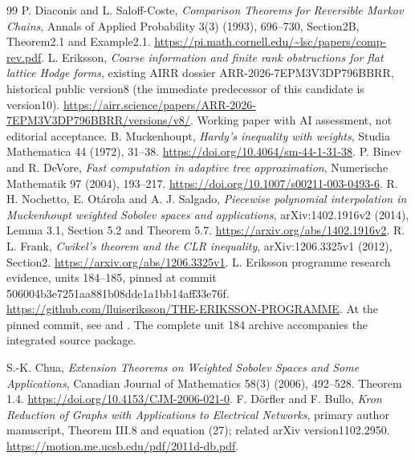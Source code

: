 \documentclass[11pt]{article}
\begin{document}
\begin{thebibliography}{99}
 P. Diaconis and L. Saloff-Coste,
\emph{Comparison Theorems for Reversible Markov Chains},
Annals of Applied Probability 3(3) (1993), 696--730,
Section2B, Theorem2.1 and Example2.1.
\url{https://pi.math.cornell.edu/~lsc/papers/comp-rev.pdf}.
 L. Eriksson, \emph{Coarse information and finite rank
obstructions for flat lattice Hodge forms}, existing AIRR dossier
ARR-2026-7EPM3V3DP796BBRR, historical public version8 (the immediate
predecessor of this candidate is version10).
\url{https://airr.science/papers/ARR-2026-7EPM3V3DP796BBRR/versions/v8/}.
Working paper with AI assessment, not editorial acceptance.
 B. Muckenhoupt, \emph{Hardy's inequality with weights},
Studia Mathematica 44 (1972), 31--38.
\url{https://doi.org/10.4064/sm-44-1-31-38}.
 P. Binev and R. DeVore, \emph{Fast computation in adaptive
tree approximation}, Numerische Mathematik 97 (2004), 193--217.
\url{https://doi.org/10.1007/s00211-003-0493-6}.
 R. H. Nochetto, E. Ot\'arola and A. J. Salgado,
\emph{Piecewise polynomial interpolation in Muckenhoupt weighted Sobolev
spaces and applications}, arXiv:1402.1916v2 (2014), Lemma 3.1,
Section 5.2 and Theorem 5.7. \url{https://arxiv.org/abs/1402.1916v2}.
 R. L. Frank, \emph{Cwikel's theorem and the CLR inequality},
arXiv:1206.3325v1 (2012), Section2.
\url{https://arxiv.org/abs/1206.3325v1}.
 L. Eriksson programme research evidence, units 184--185,
pinned at commit 506004b3e7251aa881b08dde1a1bb14aff33e76f.
\url{https://github.com/lluiseriksson/THE-ERIKSSON-PROGRAMME}.
At the pinned commit, see 
and .
The complete unit 184 archive accompanies the integrated source package.

 S.-K. Chua, \emph{Extension Theorems on Weighted
Sobolev Spaces and Some Applications}, Canadian Journal of Mathematics
58(3) (2006), 492--528. Theorem 1.4.
\url{https://doi.org/10.4153/CJM-2006-021-0}.
 F. D\"orfler and F. Bullo, \emph{Kron Reduction of
Graphs with Applications to Electrical Networks}, primary author manuscript,
Theorem III.8 and equation (27); related arXiv version1102.2950.
\url{https://motion.me.ucsb.edu/pdf/2011d-db.pdf}.
\end{thebibliography}
\end{document}
